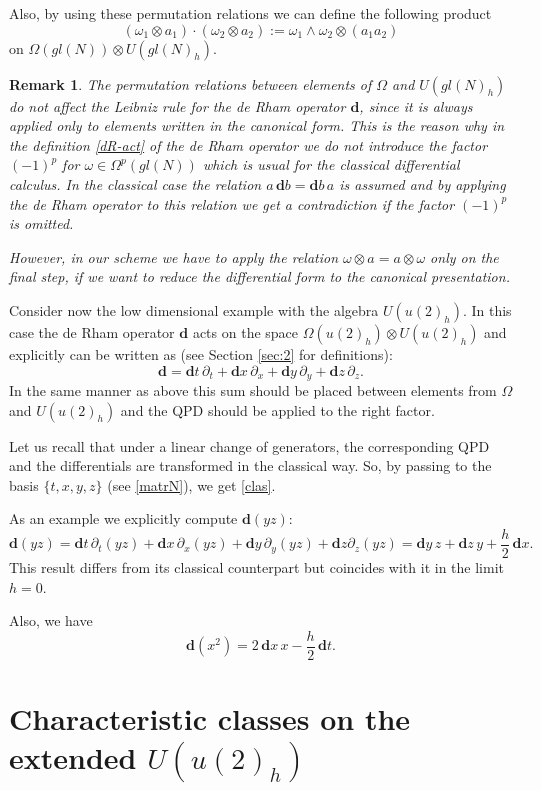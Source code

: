 \documentclass[10pt,a4paper]{amsart}
\newcommand{\pa}{\partial}
\newcommand{\ot}{\otimes}
\newcommand{\Om}{\Omega}
\newcommand{\om}{\omega}
\newcommand{\dd}{\mathbf{d}}
\numberwithin{equation}{section}
\newtheorem{remark}[theorem]{Remark}
\begin{document}
Also, by using these permutation relations  we can define the following product
\[
(\om_1\ot a_1)\cdot (\om_2\ot a_2):= \om_1\wedge \om_2\ot (a_1a_2)
\]
on $\Om(gl(N))\ot U(gl(N)_h)$.

\begin{remark}
The permutation relations between elements of $\Omega$ and $U(gl(N)_h)$ do not affect the Leibniz rule for the
de Rham operator $\dd$, since it is always applied only to elements written in the canonical form. This is the reason why
in the definition \eqref{dR-act} of the de Rham operator we do not introduce the factor $(-1)^p$ for $\om\in \Om^p(gl(N))$ which
is usual for the classical differential calculus.
In the classical case the relation $a\, \dd b=\dd b\, a$ is assumed and by applying the de Rham operator to this relation we get a contradiction if the factor 
$(-1)^p$ is omitted. 

However, in our scheme we have to apply the relation $\om\ot a=a\ot \om$ only on the final step, if we want to reduce the differential form to the canonical presentation.
\end{remark}

Consider now the low dimensional example with the algebra $U(u(2)_h)$. In this case the de Rham operator $\dd$ acts on
the space $\Om(u(2)_h)\ot  U(u(2)_h)$ and explicitly can be written as (see Section \ref{sec:2} for definitions):
\begin{equation}
\dd=\dd t \, \pa_t+\dd x \,\pa_x+\dd y\, \pa_y+\dd z\, \pa_z.
\label{clas}
\end{equation}
In the same manner as above this sum should be placed between elements from $\Om$ and $U(u(2)_h)$ and the QPD should be
applied to the right factor.

Let us recall that under a linear change of generators, the corresponding QPD and the differentials are  transformed in the classical way.
So, by passing to the basis $\{t, x, y, z\}$  (see \ref{matrN}), we get \eqref{clas}.

As an example  we explicitly compute $\dd(yz)$:
\[
\dd(yz)=\dd t \, \pa_t(yz)+\dd x \,\pa_x(yz)+\dd y\, \pa_y(yz)+\dd z \pa_z(yz)=
\dd y\, z+\dd z \, y +\frac{h}{2}\, \dd x.
\]
This result differs from its classical counterpart but coincides with it in the limit $h=0$.

Also, we have
\[
\dd(x^2)=2 \, \dd x\, x-\frac{h}{2}\, \dd t.
\]

\section[Characteristic classes on the extended U(u(2)h)]{Characteristic classes on the extended $U(u(2)_h)$}\label{sec:characteristic}
\end{document}
